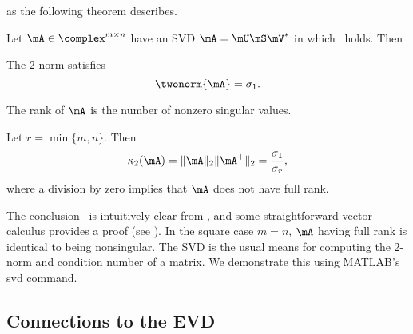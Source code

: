  as the following theorem describes. 
\begin{thm}
  \label{thm:svd}
  Let $\mA\in\complex^{m\times n}$ have an SVD $\mA=\mU\mS\mV^*$ in
  which~ holds. Then
  \begin{remunerate}
  \item The 2-norm satisfies
    \begin{equation}
      \label{eq:svdnorm}
      \twonorm{\mA} = \sigma_1.
    \end{equation}
  \item The rank of $\mA$ is the number of nonzero singular values.
  \item Let $r=\min\{m,n\}$. Then
    \begin{equation}
      \label{eq:svdcond}
      \kappa_2(\mA) = \|\mA\|_2\|\mA^+\|_2 = \frac{\sigma_1}{\sigma_r},
    \end{equation}
    where a division by zero implies that $\mA$ does not have full rank.
  \end{remunerate}
\end{thm}

The conclusion~ is intuitively clear from , and some straightforward vector calculus provides a proof (see ). In the square case $m=n$, $\mA$ having full rank is identical to being nonsingular.  The SVD is the usual means for computing the 2-norm and condition number of a matrix. We demonstrate this using MATLAB's \gls{svd} command.

\begin{exam*}
\end{exam*}

\subsection{Connections to the EVD}

